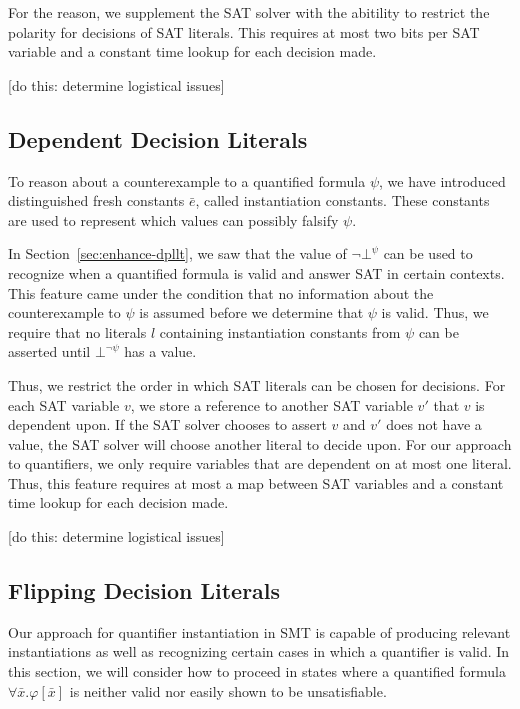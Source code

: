 \documentclass{llncs}
\begin{document}
For the reason, we supplement the SAT solver with the abitility to restrict the polarity for decisions of SAT literals.
This requires at most two bits per SAT variable and a constant time lookup for each decision made.

[do this: determine logistical issues]

\subsection{Dependent Decision Literals}

To reason about a counterexample to a quantified formula $\psi$, we have introduced distinguished fresh constants $\bar{e}$, called instantiation constants.
These constants are used to represent which values can possibly falsify $\psi$.

In Section~\ref{sec:enhance-dpllt}, we saw that the value of $\neg \bot^\psi$ can be used to recognize when a quantified formula is valid and answer SAT in certain contexts.
This feature came under the condition that no information about the counterexample to $\psi$ is assumed before we determine that $\psi$ is valid.
Thus, we require that no literals $l$ containing instantiation constants from $\psi$ can be asserted until $\bot^{ \neg \psi }$ has a value.

Thus, we restrict the order in which SAT literals can be chosen for decisions.
For each SAT variable $v$, we store a reference to another SAT variable $v'$ that $v$ is dependent upon.
If the SAT solver chooses to assert $v$ and $v'$ does not have a value, the SAT solver will choose another literal to decide upon.
For our approach to quantifiers, we only require variables that are dependent on at most one literal.
Thus, this feature requires at most a map between SAT variables and a constant time lookup for each decision made.

[do this: determine logistical issues]

\subsection{Flipping Decision Literals}

Our approach for quantifier instantiation in SMT is capable of producing relevant instantiations as well as recognizing certain cases in which a quantifier is valid. 
In this section, we will consider how to proceed in states where a quantified formula $\forall \bar{x}. \varphi[ \bar{x} ]$ is neither valid nor easily shown to be unsatisfiable. \\
\end{document}
